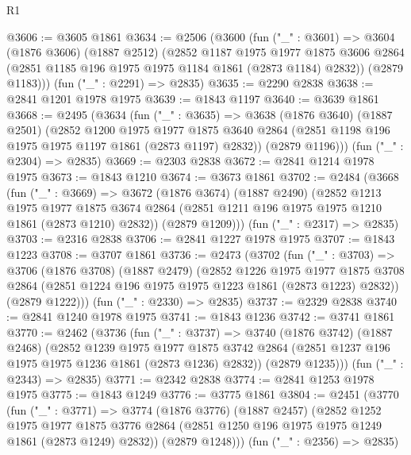 \begin{lexlean}{R1}
\begin{coremodule}
@3606 := @3605 @1861
@3634 := @2506
    (@3600
      (fun ("_" : @3601) =>
      @3604
        (@1876 @3606)
        (@1887 @2512)
        (@2852
          @1187
          @1975
          @1977
          @1875
          @3606
          @2864
          (@2851 @1185 @196 @1975 @1975 @1184 @1861 (@2873 @1184) @2832))
        (@2879 @1183)))
    (fun ("_" : @2291) => @2835)
@3635 := @2290 @2838
@3638 := @2841 @1201 @1978 @1975
@3639 := @1843 @1197
@3640 := @3639 @1861
@3668 := @2495
    (@3634
      (fun ("_" : @3635) =>
      @3638
        (@1876 @3640)
        (@1887 @2501)
        (@2852
          @1200
          @1975
          @1977
          @1875
          @3640
          @2864
          (@2851 @1198 @196 @1975 @1975 @1197 @1861 (@2873 @1197) @2832))
        (@2879 @1196)))
    (fun ("_" : @2304) => @2835)
@3669 := @2303 @2838
@3672 := @2841 @1214 @1978 @1975
@3673 := @1843 @1210
@3674 := @3673 @1861
@3702 := @2484
    (@3668
      (fun ("_" : @3669) =>
      @3672
        (@1876 @3674)
        (@1887 @2490)
        (@2852
          @1213
          @1975
          @1977
          @1875
          @3674
          @2864
          (@2851 @1211 @196 @1975 @1975 @1210 @1861 (@2873 @1210) @2832))
        (@2879 @1209)))
    (fun ("_" : @2317) => @2835)
@3703 := @2316 @2838
@3706 := @2841 @1227 @1978 @1975
@3707 := @1843 @1223
@3708 := @3707 @1861
@3736 := @2473
    (@3702
      (fun ("_" : @3703) =>
      @3706
        (@1876 @3708)
        (@1887 @2479)
        (@2852
          @1226
          @1975
          @1977
          @1875
          @3708
          @2864
          (@2851 @1224 @196 @1975 @1975 @1223 @1861 (@2873 @1223) @2832))
        (@2879 @1222)))
    (fun ("_" : @2330) => @2835)
@3737 := @2329 @2838
@3740 := @2841 @1240 @1978 @1975
@3741 := @1843 @1236
@3742 := @3741 @1861
@3770 := @2462
    (@3736
      (fun ("_" : @3737) =>
      @3740
        (@1876 @3742)
        (@1887 @2468)
        (@2852
          @1239
          @1975
          @1977
          @1875
          @3742
          @2864
          (@2851 @1237 @196 @1975 @1975 @1236 @1861 (@2873 @1236) @2832))
        (@2879 @1235)))
    (fun ("_" : @2343) => @2835)
@3771 := @2342 @2838
@3774 := @2841 @1253 @1978 @1975
@3775 := @1843 @1249
@3776 := @3775 @1861
@3804 := @2451
    (@3770
      (fun ("_" : @3771) =>
      @3774
        (@1876 @3776)
        (@1887 @2457)
        (@2852
          @1252
          @1975
          @1977
          @1875
          @3776
          @2864
          (@2851 @1250 @196 @1975 @1975 @1249 @1861 (@2873 @1249) @2832))
        (@2879 @1248)))
    (fun ("_" : @2356) => @2835)

\end{coremodule}
\end{lexlean}
